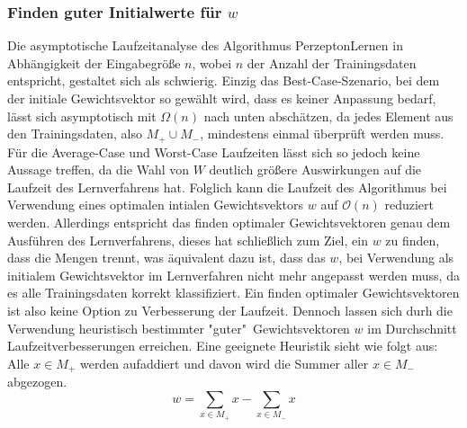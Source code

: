 \documentclass[fontsize=11pt]{scrartcl}
\begin{document}
                    \subsubsection{Finden guter Initialwerte für $w$}
                    Die asymptotische Laufzeitanalyse des Algorithmus PerzeptonLernen in Abhängigkeit der Eingabegröße $n$, wobei $n$ der Anzahl der Trainingsdaten entspricht, gestaltet sich als schwierig. Einzig das Best-Case-Szenario, bei dem der initiale Gewichtsvektor so gewählt wird, dass es keiner Anpassung bedarf, lässt sich asymptotisch mit $\Omega(n)$ nach unten abschätzen, da jedes Element aus den Trainingsdaten, also $M_+ \cup M_-$, mindestens einmal überprüft werden muss. Für die Average-Case und Worst-Case Laufzeiten lässt sich so jedoch keine Aussage treffen, da die Wahl von $W$ deutlich größere Auswirkungen auf die Laufzeit des Lernverfahrens hat.
                    Folglich kann die Laufzeit des Algorithmus bei Verwendung eines optimalen intialen Gewichtsvektors $w$ auf $\mathcal{O}(n)$ reduziert werden. Allerdings entspricht das finden optimaler Gewichtsvektoren genau dem Ausführen des Lernverfahrens, dieses hat schließlich zum Ziel, ein $w$ zu finden, dass die Mengen trennt, was äquivalent dazu ist, dass das $w$, bei Verwendung als initialem Gewichtsvektor im Lernverfahren nicht mehr angepasst werden muss, da es alle Trainingsdaten korrekt klassifiziert.
                    Ein finden optimaler Gewichtsvektoren ist also keine Option zu Verbesserung der Laufzeit.
                    \newline
                    Dennoch lassen sich durh die Verwendung heuristisch bestimmter "guter"\  Gewichtsvektoren $w$ im Durchschnitt Laufzeitverbesserungen erreichen.
                    Eine geeignete Heuristik sieht wie folgt aus: 
                    \newline
                    Alle $x\in M_+$ werden aufaddiert und davon wird die Summer aller $x\in M_-$ abgezogen.
                    $$
                        w = \sum_{x \in M_+}x - \sum_{x \in M_-}x
                    $$
\end{document}
